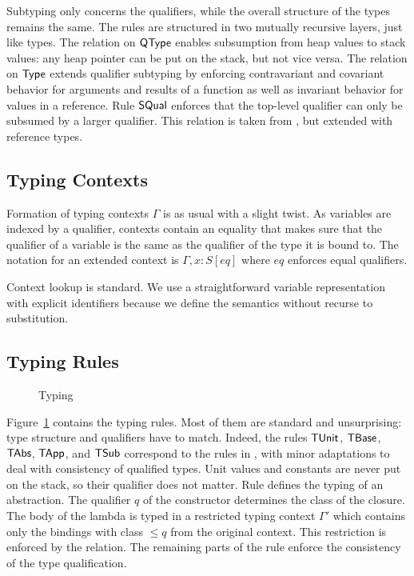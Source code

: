 \documentclass[sigplan,dvipsnames,screen]{acmart}
\begin{document}
Subtyping
only concerns the qualifiers, while the overall structure of the types
remains the same. The rules are
structured in two mutually recursive layers, just like types. The
relation on $\AQType$ enables subsumption from heap values to stack
values: any heap pointer can be put on the stack, but not vice
versa. The relation on $\AType$ extends qualifier 
subtyping by enforcing contravariant and covariant
behavior for arguments and results of a function as well as invariant
behavior for values in a reference. Rule $\ACon{SQual}$ enforces that
the top-level qualifier can only be subsumed by a larger qualifier. This relation is taken from
\citet{DBLP:conf/ecoop/XhebrajB0R22}, but extended with reference types.

\subsection{Typing Contexts}
\label{sec:typing-contexts}

Formation of typing contexts $\Gamma$ is as usual with a slight
twist. As variables are indexed by a qualifier, contexts contain an
equality that makes sure that the qualifier of a variable is the same
as the qualifier of the type it is bound to. The notation for an
extended context is $\Gamma, x:S[eq]$ where $eq$ enforces equal qualifiers.
\Contexts

Context lookup is standard. We use a straightforward variable
representation with explicit identifiers because we define the
semantics without recurse to substitution.
\ContextLookup

\subsection{Typing Rules}
\label{sec:typing-rules}
\begin{figure}[tp]
  \TypingRules  
  \caption{Typing}
  \label{fig:typing}
\end{figure}
Figure~\ref{fig:typing} contains the typing rules. Most of them are
standard and unsurprising: type structure and qualifiers have to
match. Indeed, the rules $\ACTUnit$, $\ACTBase$, $\ACTAbs$, $\ACTApp$,
and $\ACTSub$ correspond to the rules in
\citet{DBLP:conf/ecoop/XhebrajB0R22}, with minor adaptations to deal
with consistency of qualified types.
Unit values and constants are never put on the stack, so their
qualifier does not matter. Rule {\ACTAbs} defines the typing of an
abstraction. The qualifier $q$ of the {\AClam} constructor determines
the class of the closure. The body of the lambda is typed in a
restricted typing context $\Gamma'$ which contains only the
bindings with class $\le q$ from the original context. This
restriction is enforced by the {\AqBounded} relation. The remaining
parts of the rule enforce the consistency of the type
qualification.
\end{document}
